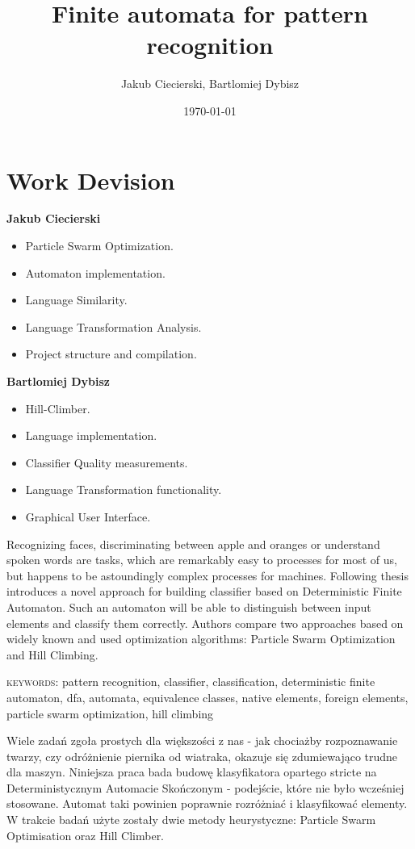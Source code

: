 \documentclass{mini}
\title{Finite automata for pattern recognition}
\author{Jakub Ciecierski, Bartlomiej Dybisz}
\date{\today}
\begin{document}
\maketitle
\tableofcontents



\chapter*{Work Devision}

{\bf Jakub Ciecierski}
\begin{itemize}
    \item Particle Swarm Optimization.
    \item Automaton implementation.
    \item Language Similarity.
    \item Language Transformation Analysis.
    \item Project structure and compilation.
\end{itemize}

{\bf Bartlomiej Dybisz}
\begin{itemize}
    \item Hill-Climber.
    \item Language implementation.
    \item Classifier Quality measurements.
    \item Language Transformation functionality.
    \item Graphical User Interface.
\end{itemize}


\abstract
Recognizing faces, discriminating between apple and oranges or understand spoken words are tasks, which are remarkably easy to processes for most of us, but happens to be astoundingly complex processes for machines. Following thesis introduces a novel approach for building classifier based on  Deterministic Finite Automaton. Such an automaton will be able to distinguish between input elements and classify them correctly. Authors compare two approaches based on widely known and used optimization algorithms: Particle Swarm Optimization and Hill Climbing. 

\bigskip
\textsc{keywords}: pattern recognition, classifier, classification, deterministic finite automaton, dfa, automata, equivalence classes, native elements, foreign elements, particle swarm optimization, hill climbing

\abstract
Wiele zadań zgoła prostych dla większości z nas - jak chociażby rozpoznawanie twarzy, czy odróżnienie piernika od wiatraka, okazuje się zdumiewająco trudne dla maszyn. Niniejsza praca bada budowę klasyfikatora opartego stricte na Deterministycznym Automacie Skończonym - podejście, które nie było wcześniej stosowane. Automat taki powinien poprawnie rozróżniać i klasyfikować elementy. W trakcie badań użyte zostały dwie metody heurystyczne: Particle Swarm Optimisation oraz Hill Climber.
\end{document}

